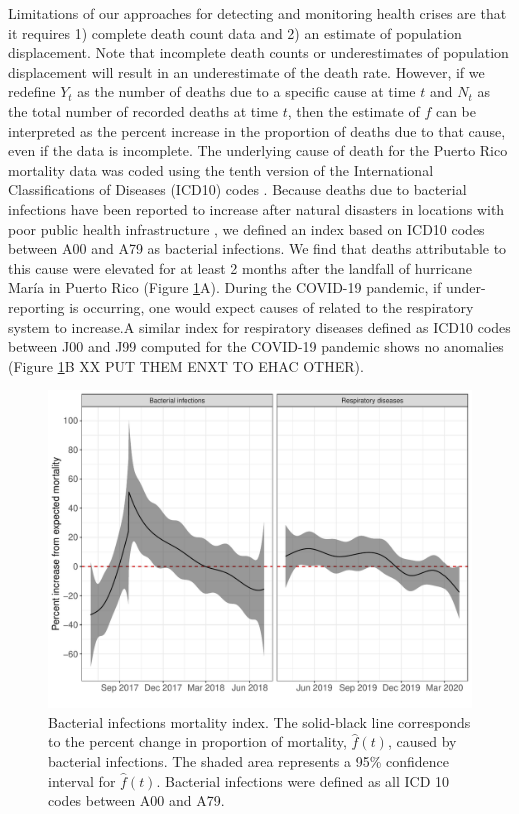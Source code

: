 \documentclass[11pt]{article}
\begin{document}
Limitations of our approaches for detecting and monitoring health crises are that it requires 1) complete death count data and 2) an estimate of population displacement. Note that incomplete death counts or underestimates of population displacement will result in an underestimate of the death rate. However, if we redefine $Y_t$ as the number of deaths due to a specific cause at time $t$ and $N_t$ as the total number of recorded deaths at time $t$, then the estimate of $f$ can be interpreted as the percent increase in the proportion of deaths due to that cause, even if the data is incomplete. The underlying cause of death for the Puerto Rico mortality data was coded using the tenth version of the International Classifications of Diseases (ICD10) codes \cite{world2004icd}. Because deaths due to bacterial infections have been reported to increase after natural disasters in locations with poor public health infrastructure \cite{ligon2006infectious, cook200810th}, we defined an index based on ICD10 codes between A00 and A79 as bacterial infections. We find that deaths attributable to this cause were elevated for at least 2 months after the landfall of hurricane Mar\'ia in Puerto Rico (Figure \ref{fig:fhat-bacteria}A). During the COVID-19 pandemic, if under-reporting is occurring, one would expect causes of related to the respiratory system to increase.A similar index for respiratory diseases defined as ICD10 codes between J00 and J99 computed for the COVID-19 pandemic shows no anomalies  (Figure \ref{fig:fhat-bacteria}B XX PUT THEM ENXT TO EHAC OTHER).

\begin{figure}[ht]
	\centering	
		\includegraphics[width=1\linewidth]{figs/figure-4.pdf} 
	\caption{Bacterial infections mortality index. The solid-black line corresponds to the percent change in proportion of mortality, $\hat{f}(t)$, caused by bacterial infections. The shaded area represents a 95\% confidence interval for $\hat{f}(t)$. Bacterial infections were defined as all ICD 10 codes between A00 and A79.}
	\label{fig:fhat-bacteria}
\end{figure}
\end{document}
